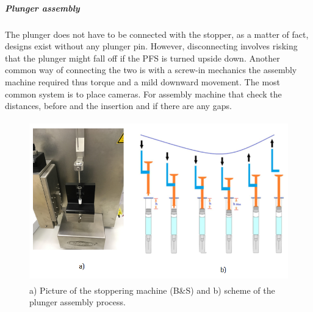 
\subparagraph{Plunger assembly}
The plunger does not have to be connected with the stopper, as a matter of fact, designs exist without any plunger pin. However, disconnecting involves risking that the plunger might fall off if the PFS is turned upside down. Another common way of connecting the two is with a screw-in mechanics the assembly machine required thus torque and a mild downward movement.
The most common system is to place cameras. For assembly machine that check the distances, before and the insertion and if there are any gaps.
\begin{figure}[h]	
	\centering
\includegraphics[height=7cm]{img/plungering.PNG}
   \caption{a) Picture of the stoppering machine (B\&S) and b) scheme of the plunger assembly process.}
 \label{fgr:PFS}
\end{figure}

\newpage
